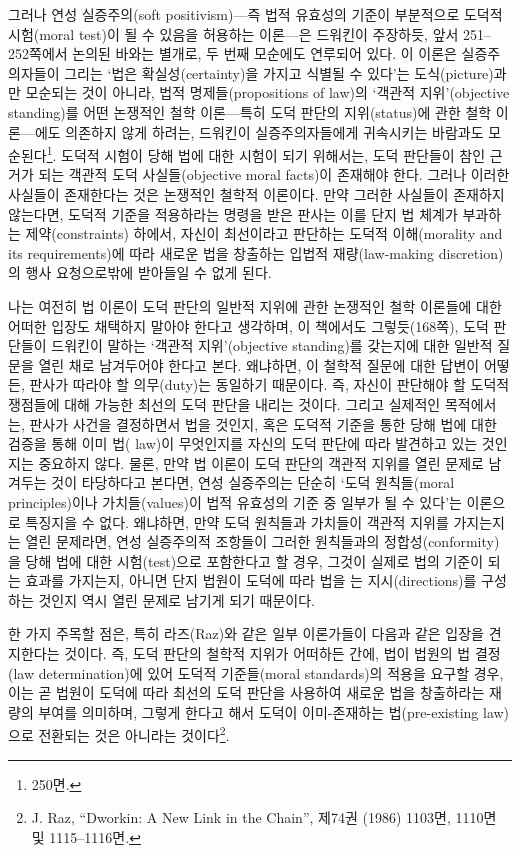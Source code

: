 그러나 연성 실증주의(soft positivism)---즉 법적 유효성의 기준이
부분적으로 도덕적 시험(moral test)이 될 수 있음을 허용하는 이론---은
드워킨이 주장하듯, 앞서 251--252쪽에서 논의된 바와는 별개로, 두 번째
모순에도 연루되어 있다. 이 이론은 실증주의자들이 그리는 `법은
확실성(certainty)을 가지고 식별될 수 있다'는 도식(picture)과만 모순되는
것이 아니라, 법적 명제들(propositions of law)의 `객관적 지위'(objective
standing)를 어떤 논쟁적인 철학 이론---특히 도덕 판단의 지위(status)에
관한 철학 이론---에도 의존하지 않게 하려는, 드워킨이 실증주의자들에게
귀속시키는 바람과도 모순된다\footnote{ 250면.}. 도덕적 시험이
당해 법에 대한 시험이 되기 위해서는, 도덕 판단들이 참인 근거가 되는
객관적 도덕 사실들(objective moral facts)이 존재해야 한다. 그러나 이러한
사실들이 존재한다는 것은 논쟁적인 철학적 이론이다. 만약 그러한 사실들이
존재하지 않는다면, 도덕적 기준을 적용하라는 명령을 받은 판사는 이를 단지
법 체계가 부과하는 제약(constraints) 하에서, 자신이 최선이라고 판단하는
도덕적 이해(morality and its requirements)에 따라 새로운 법을 창출하는
입법적 재량(law-making discretion)의 행사 요청으로밖에 받아들일 수 없게
된다.

나는 여전히 법 이론이 도덕 판단의 일반적 지위에 관한 논쟁적인 철학
이론들에 대한 어떠한 입장도 채택하지 말아야 한다고 생각하며, 이 책에서도
그렇듯(168쪽), 도덕 판단들이 드워킨이 말하는 `객관적 지위'(objective
standing)를 갖는지에 대한 일반적 질문을 열린 채로 남겨두어야 한다고
본다. 왜냐하면, 이 철학적 질문에 대한 답변이 어떻든, 판사가 따라야 할
의무(duty)는 동일하기 때문이다. 즉, 자신이 판단해야 할 도덕적 쟁점들에
대해 가능한 최선의 도덕 판단을 내리는 것이다. 그리고 실제적인
목적에서는, 판사가 사건을 결정하면서 법을 
것인지, 혹은 도덕적 기준을 통한 당해 법에 대한 검증을 통해 이미
 법( law)이 무엇인지를 자신의 도덕 판단에
따라 발견하고 있는 것인지는 중요하지 않다. 물론, 만약 법 이론이 도덕
판단의 객관적 지위를 열린 문제로 남겨두는 것이 타당하다고 본다면, 연성
실증주의는 단순히 `도덕 원칙들(moral principles)이나 가치들(values)이
법적 유효성의 기준 중 일부가 될 수 있다'는 이론으로 특징지을 수 없다.
왜냐하면, 만약 도덕 원칙들과 가치들이 객관적 지위를 가지는지는 열린
문제라면, 연성 실증주의적 조항들이 그러한 원칙들과의
정합성(conformity)을 당해 법에 대한 시험(test)으로 포함한다고 할 경우,
그것이 실제로 법의 기준이 되는 효과를 가지는지, 아니면 단지 법원이
도덕에 따라 법을 는 지시(directions)를 구성하는
것인지 역시 열린 문제로 남기게 되기 때문이다.

한 가지 주목할 점은, 특히 라즈(Raz)와 같은 일부 이론가들이 다음과 같은
입장을 견지한다는 것이다. 즉, 도덕 판단의 철학적 지위가 어떠하든 간에,
법이 법원의 법 결정(law determination)에 있어 도덕적 기준들(moral
standards)의 적용을 요구할 경우, 이는 곧 법원이 도덕에 따라 최선의 도덕
판단을 사용하여 새로운 법을 창출하라는 재량의 부여를 의미하며, 그렇게
한다고 해서 도덕이 이미-존재하는 법(pre-existing law)으로 전환되는 것은
아니라는 것이다\footnote{J. Raz, ``Dworkin: A New Link in the Chain'',
   제74권 (1986) 1103면, 1110면 및
  1115--1116면.}.

